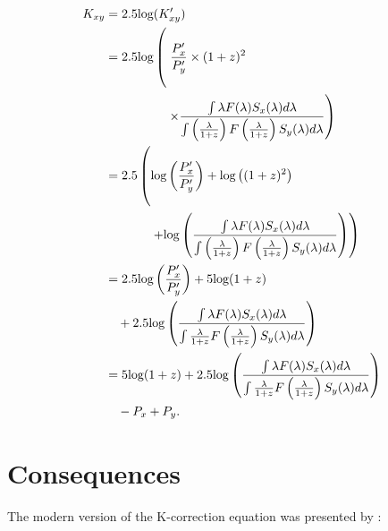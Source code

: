 \documentclass[aps,prl,reprint,amsmath,floatfix]{revtex4-2}
\begin{document}
\begin{equation}
\begin{aligned}
\label{eq:K2k}
  K_{xy} &= 2.5\text{log}(K'_{xy}) \\
         &= 2.5\text{log}
  \begin{aligned}[t]
          &\left( \vphantom{\frac{\int}{\left(\frac{\int}{1}\right)}} \right.
              \frac{P'_x}{P'_y} \times (1 + z)^2 \\
          &\left.\quad \times
              \frac{\int \lambda F(\lambda) S_x(\lambda) d\lambda}
                   {\int \left(\frac{\lambda}{1+z}\right) F\left(\frac{\lambda}{1+z}\right) S_y(\lambda) d\lambda}\right)
  \end{aligned} \\
         &= 2.5
  \begin{aligned}[t]
         &\left( \vphantom{\frac{\int}{\left(\frac{\int}{1}\right)}}
            \text{log} \left( \frac{P'_x}{P'_y} \right)
            + \text{log}\left( {(1 + z)^2}\right) \right. \\
         &\left.\quad + \text{log}\left( \frac{\int \lambda F(\lambda) S_x(\lambda) d\lambda}
                                    {\int \left(\frac{\lambda}{1+z}\right) F\left(\frac{\lambda}{1+z}\right) S_y(\lambda) d\lambda}
            \right) \right)
  \end{aligned} \\
         &= 2.5 \text{log} \left( \frac{P'_x}{P'_y} \right)
            + 5 \text{log} (1 + z) \\
            &\quad + 2.5 \text{log} \left(
              \frac{\int \lambda F(\lambda) S_x(\lambda) d\lambda}
                   {\int \frac{\lambda}{1+z} F\left(\frac{\lambda}{1+z}\right) S_y(\lambda) d\lambda} \right) \\
         &= 5 \text{log} (1 + z)
            + 2.5 \text{log} \left(
              \frac{\int \lambda F(\lambda) S_x(\lambda) d\lambda}
                   {\int \frac{\lambda}{1+z} F\left(\frac{\lambda}{1+z}\right) S_y(\lambda) d\lambda} \right) \\
            &\quad - P_x + P_y .
\end{aligned}
\end{equation}

\section{Consequences}

The modern version of the K-correction equation was presented by \citet{kim1996}:
\end{document}
